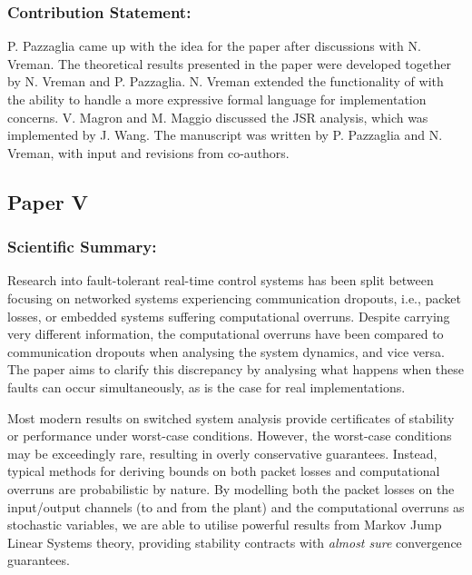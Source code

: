 \subsubsection*{Contribution Statement:}%
%
P. Pazzaglia came up with the idea for the paper after discussions with N. Vreman.
The theoretical results presented in the paper were developed together by N. Vreman and P. Pazzaglia.
N. Vreman extended the functionality of \tool{} with the ability to handle a more expressive formal language for implementation concerns.
V. Magron and M. Maggio discussed the JSR analysis, which was implemented by J. Wang.
The manuscript was written by P. Pazzaglia and N. Vreman, with input and revisions from co-authors.


\subsection*{Paper V}%
%
\begin{quote}
\end{quote}

\subsubsection*{Scientific Summary:}%
%
Research into fault-tolerant real-time control systems has been split between focusing on networked systems experiencing communication dropouts, i.e., packet losses, or embedded systems suffering computational overruns.
Despite carrying very different information, the computational overruns have been compared to communication dropouts when analysing the system dynamics, and vice versa.
The paper aims to clarify this discrepancy by analysing what happens when these faults can occur simultaneously, as is the case for real implementations.

Most modern results on switched system analysis provide certificates of stability or performance under worst-case conditions.
However, the worst-case conditions may be exceedingly rare, resulting in overly conservative guarantees.
Instead, typical methods for deriving bounds on both packet losses and computational overruns are probabilistic by nature.
By modelling both the packet losses on the input/output channels (to and from the plant) and the computational overruns as stochastic variables, we are able to utilise powerful results from Markov Jump Linear Systems theory, providing stability contracts with \emph{almost sure} convergence guarantees.

